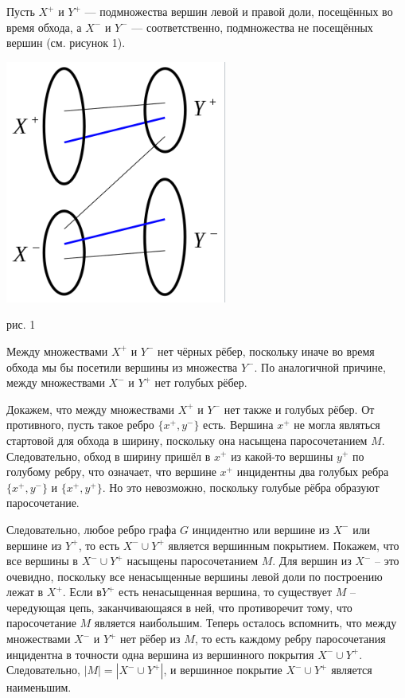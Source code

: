 \documentclass[a4paper,12pt]{article} %
\begin{document}
Пусть $X^{+}$ и $Y^{+}$ — подмножества вершин левой и правой доли, посещённых во время обхода, а $X^{-}$ и $ Y^{-}$ — соответственно, подмножества не посещённых вершин (см. рисунок 1).

\begin{center}
\includegraphics[scale=1]{6 2}

рис. 1
\end{center}

Между множествами $X^{+}$ и $ Y^{-}$ нет чёрных рёбер, поскольку иначе во время обхода мы бы посетили вершины из множества $Y^{-}$. По аналогичной причине, между множествами $X^{-}$ и $Y^{+}$ нет голубых рёбер.

Докажем, что между множествами $ X^{+}$ и $Y^{-}$ нет также и голубых рёбер. От противного, пусть такое ребро $\{x^{+},y^{-}\}$ есть. Вершина $x^{+}$ не могла являться стартовой для обхода в ширину, поскольку она насыщена паросочетанием $M$. Следовательно, обход в ширину пришёл в $x^{+}$ из какой-то вершины $y^{+}$ по голубому ребру, что означает, что вершине $x^{+}$ инцидентны два голубых ребра $\{x^{+},y^{-}\}$ и $\{x^{+},y^{+}\}$. Но это невозможно, поскольку голубые рёбра образуют паросочетание.

Следовательно, любое ребро графа $G$ инцидентно или вершине из $X^{-}$ или вершине из $Y^{+}$, то есть $X^{-}\cup Y^{+}$ является вершинным покрытием. Покажем, что все вершины в $X^{-}\cup Y^{+}$ насыщены паросочетанием $M$. Для вершин из $X^{-}$ -- это очевидно, поскольку все ненасыщенные вершины левой доли по построению лежат в $X^{+}$. Если в$Y^{+}$ есть ненасыщенная вершина, то существует $M$ --чередующая цепь, заканчивающаяся в ней, что противоречит тому, что паросочетание $M$ является наибольшим. Теперь осталось вспомнить, что между множествами $X^{-}$ и $Y^{+}$ нет рёбер из $M$, то есть каждому ребру паросочетания инцидентна в точности одна вершина из вершинного покрытия $ X^{-}\cup Y^{+}$. Следовательно, $|M|=|X^{-}\cup Y^{+}|$, и вершинное покрытие $X^{-}\cup Y^{+}$ является наименьшим.
\end{document}
